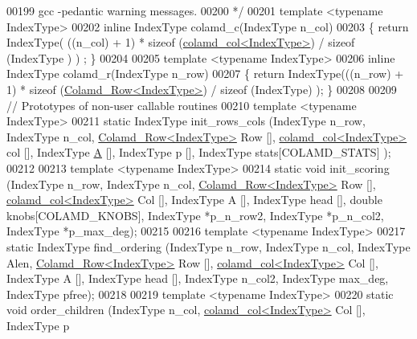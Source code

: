 \begin{DoxyCode}
00199 \textcolor{comment}{  gcc -pedantic warning messages.}
00200 \textcolor{comment}{*/}
00201 \textcolor{keyword}{template} <\textcolor{keyword}{typename} IndexType>
00202 \textcolor{keyword}{inline} IndexType colamd\_c(IndexType n\_col) 
00203 \{ \textcolor{keywordflow}{return} IndexType( ((n\_col) + 1) * \textcolor{keyword}{sizeof} (\hyperlink{structinternal_1_1colamd__col}{colamd\_col<IndexType>}) / \textcolor{keyword}{sizeof} (IndexType
      ) ) ; \}
00204 
00205 \textcolor{keyword}{template} <\textcolor{keyword}{typename} IndexType>
00206 \textcolor{keyword}{inline} IndexType  colamd\_r(IndexType n\_row)
00207 \{ \textcolor{keywordflow}{return} IndexType(((n\_row) + 1) * \textcolor{keyword}{sizeof} (\hyperlink{structinternal_1_1_colamd___row}{Colamd\_Row<IndexType>}) / \textcolor{keyword}{sizeof} (IndexType)
      ); \}
00208 
00209 \textcolor{comment}{// Prototypes of non-user callable routines}
00210 \textcolor{keyword}{template} <\textcolor{keyword}{typename} IndexType>
00211 \textcolor{keyword}{static} IndexType init\_rows\_cols (IndexType n\_row, IndexType n\_col, 
      \hyperlink{structinternal_1_1_colamd___row}{Colamd\_Row<IndexType>} Row [], \hyperlink{structinternal_1_1colamd__col}{colamd\_col<IndexType>} col [], 
      IndexType \hyperlink{group___core___module_class_eigen_1_1_matrix}{A} [], IndexType p [], IndexType stats[COLAMD\_STATS] ); 
00212 
00213 \textcolor{keyword}{template} <\textcolor{keyword}{typename} IndexType>
00214 \textcolor{keyword}{static} \textcolor{keywordtype}{void} init\_scoring (IndexType n\_row, IndexType n\_col, 
      \hyperlink{structinternal_1_1_colamd___row}{Colamd\_Row<IndexType>} Row [], \hyperlink{structinternal_1_1colamd__col}{colamd\_col<IndexType>} Col [], 
      IndexType A [], IndexType head [], \textcolor{keywordtype}{double} knobs[COLAMD\_KNOBS], IndexType *p\_n\_row2, IndexType *p\_n\_col2, 
      IndexType *p\_max\_deg);
00215 
00216 \textcolor{keyword}{template} <\textcolor{keyword}{typename} IndexType>
00217 \textcolor{keyword}{static} IndexType find\_ordering (IndexType n\_row, IndexType n\_col, IndexType Alen, 
      \hyperlink{structinternal_1_1_colamd___row}{Colamd\_Row<IndexType>} Row [], \hyperlink{structinternal_1_1colamd__col}{colamd\_col<IndexType>} Col [], 
      IndexType A [], IndexType head [], IndexType n\_col2, IndexType max\_deg, IndexType pfree);
00218 
00219 \textcolor{keyword}{template} <\textcolor{keyword}{typename} IndexType>
00220 \textcolor{keyword}{static} \textcolor{keywordtype}{void} order\_children (IndexType n\_col, \hyperlink{structinternal_1_1colamd__col}{colamd\_col<IndexType>} Col [], IndexType p

\end{DoxyCode}
